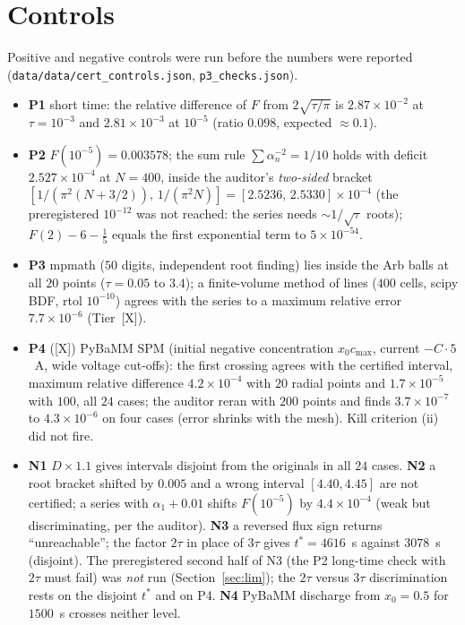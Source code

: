\documentclass[10pt]{article}
\newcommand{\tier}[1]{\textsf{[#1]}}
\newcommand{\tX}{\tier{X}}
\newcommand{\cmax}{c_{\max}}
\begin{document}
\section{Controls}\label{sec:controls}
Positive and negative controls were run before the numbers were reported (\texttt{data/data/cert\_controls.json}, \texttt{p3\_checks.json}).
\begin{itemize}\itemsep=1pt
\item \textbf{P1} short time: the relative difference of $F$ from $2\sqrt{\tau/\pi}$ is $2.87\times10^{-2}$ at $\tau=10^{-3}$ and $2.81\times10^{-3}$ at $10^{-5}$ (ratio $0.098$, expected $\approx0.1$).
\item \textbf{P2} $F(10^{-5})=0.003578$; the sum rule $\sum\alpha_n^{-2}=1/10$ holds with deficit $2.527\times10^{-4}$ at $N=400$, inside the auditor's \emph{two-sided} bracket $[1/(\pi^2(N+3/2)),\,1/(\pi^2N)]=[2.5236,\,2.5330]\times10^{-4}$ (the preregistered $10^{-12}$ was not reached: the series needs $\sim1/\sqrt\tau$ roots); $F(2)-6-\tfrac15$ equals the first exponential term to $5\times10^{-54}$.
\item \textbf{P3} mpmath ($50$ digits, independent root finding) lies inside the Arb balls at all $20$ points ($\tau=0.05$ to $3.4$); a finite-volume method of lines ($400$ cells, scipy BDF, rtol $10^{-10}$) agrees with the series to a maximum relative error $7.7\times10^{-6}$ (Tier~\tX{}).
\item \textbf{P4} (\tX{}) PyBaMM SPM (initial negative concentration $x_0\cmax$, current $-C\cdot5$~A, wide voltage cut-offs): the first crossing agrees with the certified interval, maximum relative difference $4.2\times10^{-4}$ with $20$ radial points and $1.7\times10^{-5}$ with $100$, all $24$ cases; the auditor reran with $200$ points and finds $3.7\times10^{-7}$ to $4.3\times10^{-6}$ on four cases (error shrinks with the mesh). Kill criterion (ii) did not fire.
\item \textbf{N1} $D\times1.1$ gives intervals disjoint from the originals in all $24$ cases. \textbf{N2} a root bracket shifted by $0.005$ and a wrong interval $[4.40,4.45]$ are not certified; a series with $\alpha_1+0.01$ shifts $F(10^{-5})$ by $4.4\times10^{-4}$ (weak but discriminating, per the auditor). \textbf{N3} a reversed flux sign returns ``unreachable''; the factor $2\tau$ in place of $3\tau$ gives $t^*=4616$~s against $3078$~s (disjoint). The preregistered second half of N3 (the P2 long-time check with $2\tau$ must fail) was \emph{not} run (Section~\ref{sec:lim}); the $2\tau$ versus $3\tau$ discrimination rests on the disjoint $t^*$ and on P4. \textbf{N4} PyBaMM discharge from $x_0=0.5$ for $1500$~s crosses neither level.
\end{itemize}
\end{document}

